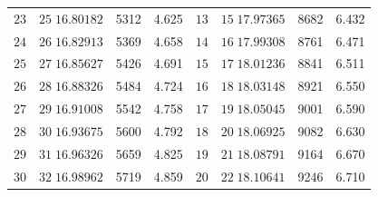 \begin{center}
\begin{tabular}{|r|r|r|r||r|r|r|r|}
\(23\)&\(25\;16.80182\)&5312&4.625&\(13\)&\(15\;17.97365\)&8682&6.432\\
\(24\)&\(26\;16.82913\)&5369&4.658&\(14\)&\(16\;17.99308\)&8761&6.471\\
\(25\)&\(27\;16.85627\)&5426&4.691&\(15\)&\(17\;18.01236\)&8841&6.511\\
\(26\)&\(28\;16.88326\)&5484&4.724&\(16\)&\(18\;18.03148\)&8921&6.550\\
\(27\)&\(29\;16.91008\)&5542&4.758&\(17\)&\(19\;18.05045\)&9001&6.590\\
\(28\)&\(30\;16.93675\)&5600&4.792&\(18\)&\(20\;18.06925\)&9082&6.630\\
\(29\)&\(31\;16.96326\)&5659&4.825&\(19\)&\(21\;18.08791\)&9164&6.670\\
\(30\)&\(32\;16.98962\)&5719&4.859&\(20\)&\(22\;18.10641\)&9246&6.710\\
\hline
\end{tabular}
\end{center}
\endgroup
